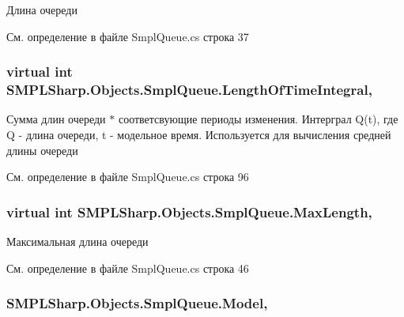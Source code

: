 Длина очереди 



См. определение в файле Smpl\-Queue.\-cs строка 37

\hypertarget{class_s_m_p_l_sharp_1_1_objects_1_1_smpl_queue_a157275049efc507053a44cbd72d7ba2f}{
\subsubsection[{Length\-Of\-Time\-Integral}]{\setlength{\rightskip}{0pt plus 5cm}virtual int S\-M\-P\-L\-Sharp.\-Objects.\-Smpl\-Queue.\-Length\-Of\-Time\-Integral\hspace{0.3cm}{\ttfamily [get]}, {\ttfamily [set]}}}\label{d3/ded/class_s_m_p_l_sharp_1_1_objects_1_1_smpl_queue_a157275049efc507053a44cbd72d7ba2f}


Сумма длин очереди $\ast$ соответсвующие периоды изменения. Интерграл Q(t), где Q -\/ длина очереди, t -\/ модельное время. Используется для вычисления средней длины очереди 



См. определение в файле Smpl\-Queue.\-cs строка 96

\hypertarget{class_s_m_p_l_sharp_1_1_objects_1_1_smpl_queue_ac807329d1f3d17f6e651fc20ad50c06c}{
\subsubsection[{Max\-Length}]{\setlength{\rightskip}{0pt plus 5cm}virtual int S\-M\-P\-L\-Sharp.\-Objects.\-Smpl\-Queue.\-Max\-Length\hspace{0.3cm}{\ttfamily [get]}, {\ttfamily [set]}}}\label{d3/ded/class_s_m_p_l_sharp_1_1_objects_1_1_smpl_queue_ac807329d1f3d17f6e651fc20ad50c06c}


Максимальная длина очереди 



См. определение в файле Smpl\-Queue.\-cs строка 46

\hypertarget{class_s_m_p_l_sharp_1_1_objects_1_1_smpl_queue_a4fd05b0b855d569bd43a71c738b9bb7f}{
\subsubsection[{Model}]{ S\-M\-P\-L\-Sharp.\-Objects.\-Smpl\-Queue.\-Model\hspace{0.3cm}{\ttfamily [get]}, {\ttfamily [set]}}}\label{d3/ded/class_s_m_p_l_sharp_1_1_objects_1_1_smpl_queue_a4fd05b0b855d569bd43a71c738b9bb7f}


